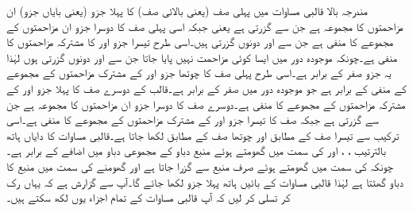 مندرجہ بالا قالبی مساوات میں پہلی صف  (یعنی بالائی صف) کا پہلا جزو (یعنی بایاں جزو) ان مزاحمتوں کا مجموعہ ہے جن سے  گزرتی ہے یعنی  جبکہ اسی پہلی صف کا دوسرا جزو ان مزاحمتوں کے مجموعے کا منفی ہے جن سے  اور  دونوں گزرتی ہیں۔اسی طرح تیسرا جزو  اور  کا مشترکہ مزاحمتوں کا منفی ہے۔چونکہ موجودہ دور میں ایسا کوئی مزاحمت نہیں پایا جاتا جن سے  اور  دونوں گزرتی ہوں لہٰذا یہ جزو صفر کے برابر ہے۔اسی طرح پہلی صف کا چوتھا  جزو  اور  کے مشترک مزاحمتوں کے مجموعے کے منفی کے برابر ہے جو موجودہ دور میں صفر کے برابر ہے۔قالب کے دوسرے صف کا پہلا جزو  اور  کے مشترکہ مزاحمتوں کے مجموعے کا منفی ہے۔دوسرے صف کا دوسرا جزو ان مزاحمتوں کا مجموعہ ہے جن سے  گزرتی ہے جبکہ صف کا تیسرا جزو  اور  کے مشترک مزاحمتوں کے مجموعے کا منفی ہے۔اسی ترکیب سے تیسرا صف  کے مطابق اور چوتھا صف  کے مطابق لکھا جاتا ہے۔قالبی مساوات کا دایاں ہاتھ بالترتیب ، ،  اور  کی سمت میں گھومتے ہوئے منبع دباو کے مجموعی دباو میں اضافے کے برابر ہے۔چونکہ  کی سمت میں گھومتے ہوئے صرف منبع  سے گزرا جاتا ہے اور گھومنے کی سمت میں منبع کا دباو گھٹتا ہے لہٰذا قالبی مساوات کے بائیں ہاتھ پہلا جزو  لکھا جائے گا۔آپ سے گزارش ہے کہ یہاں رک کر تسلی کر لیں کہ آپ قالبی مساوات کے تمام اجزاء یوں لکھ سکتے ہیں۔ 

